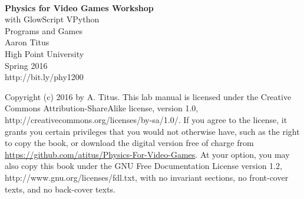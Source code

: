 \documentclass[10pt]{tituslab}
\begin{document}
\myeqnspacing %
\frontmatter
\yesiwantarabic
\frontmatter
\thispagestyle{empty}
\noindent\vspace{0mm}\\
\noindent\vspace{10mm}\hspace{0mm}\textsf{\textbf{\LARGE{Physics for Video Games Workshop}}}\\
\noindent\vspace{4mm}\hspace{4in}\textsf{\Large{with GlowScript VPython}}\\
\noindent\vspace{4mm}\hspace{4in}\textsf{\Large{Programs and Games}}\\
\noindent\vspace{4mm}\hspace{4in}\textsf{\Large{Aaron Titus}}\\
\noindent\vspace{4mm}\hspace{4in}\textsf{\Large{High Point University}}\\
\noindent\vspace{4mm}\hspace{4in}\textsf{Spring 2016}\\
\noindent\vspace{4mm}\hspace{4in}\textsf{http://bit.ly/phy1200}
\yesiwantarabic
\mynormaltype

\pagebreak[4]
\noindent
Copyright (c) 2016 by A. Titus. This lab manual is
    licensed under the Creative Commons
    Attribution-ShareAlike license, version 1.0, 
    http://creativecommons.org/licenses/by-sa/1.0/.
    If you agree to the license, it grants you certain privileges that
    you would not otherwise have, such as the right to copy the book,
    or download the digital version free of charge from
    \href{https://github.com/atitus/Physics-For-Video-Games}{https://github.com/atitus/Physics-For-Video-Games}. At your option, you may also copy this book
    under the GNU Free Documentation License version 1.2, http://www.gnu.org/licenses/fdl.txt,
    with no invariant sections, no front-cover texts, and no back-cover texts.


\tableofcontents
\mainmatter
\startchaptersonleftpage
\addtocounter{page}{4} 
\parafmt
\myeqnspacing %
\end{document}

